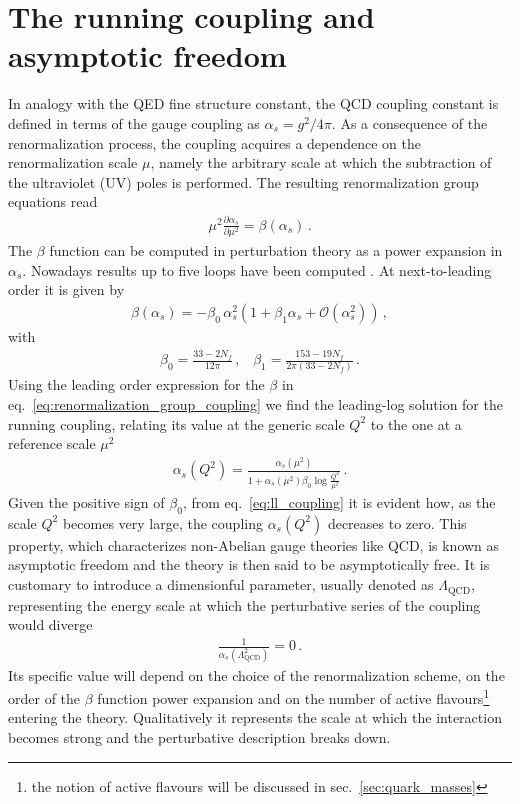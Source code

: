 \section{The running coupling and asymptotic freedom}
%
In analogy with the QED fine structure constant,
the QCD coupling constant is defined in terms of the gauge coupling as $\alpha_s = g^2/4\pi$.
As a consequence of the renormalization process, the coupling acquires a dependence on the renormalization scale $\mu$,
namely the arbitrary scale at which the subtraction of the ultraviolet (UV) poles is performed. 
The resulting renormalization group equations read
\begin{align}
    \label{eq:renormalization_group_coupling}
    \mu^2\frac{\partial\alpha_s}{\partial \mu^2} = \beta\left(\alpha_s\right)\,.
\end{align}
The $\beta$ function can be computed in perturbation theory as a power expansion in $\alpha_s$. 
Nowadays results up to five loops have been computed \cite{Herzog:2017ohr}.
At next-to-leading order it is given by
\begin{align}
    \label{eq:beta_function_expansion}
    \beta\left(\alpha_s\right) = -\beta_0\,\alpha_s^2\left(1+ \beta_1 \alpha_s + \mathcal{O}\left(\alpha_s^2\right)\right)\,,
\end{align}
with
\begin{align}
    \label{eq:beta_function_coefficients}
    \beta_0 = \frac{33 - 2 N_f}{12\pi}\,,\,\,\,\,\,
    \beta_1 = \frac{153 -19 N_f}{2\pi\left(33-2 N_f\right)}\,.
\end{align}
Using the leading order expression for the $\beta$ in eq.~\eqref{eq:renormalization_group_coupling} we find the leading-log
solution for the running coupling, relating its value at the generic scale $Q^2$ to the one at a reference scale
$\mu^2$ 
\begin{align}
    \label{eq:ll_coupling}
    \alpha_s\left(Q^2\right) = \frac{\alpha_s\left(\mu^2\right)}{1+\alpha_s\left(\mu^2\right)\beta_0\log\frac{Q^2}{\mu^2}}\,.
\end{align}
Given the positive sign of $\beta_0$, from eq.~\eqref{eq:ll_coupling} it is evident how, as the scale $Q^2$ becomes very large, 
the coupling $\alpha_s\left(Q^2\right)$ decreases to zero. This property, which characterizes non-Abelian gauge theories 
like QCD, is known as asymptotic freedom and the theory is then said to be asymptotically free.
It is customary to introduce a dimensionful parameter, usually denoted as $\Lambda_{\text{QCD}}$, representing the energy 
scale at which the perturbative series of the coupling would diverge
\begin{align}
    \label{eq:lambda_QCD}
    \frac{1}{\alpha_s\left(\Lambda_{\text{QCD}}^2\right)} = 0\,.
\end{align}
Its specific value will depend on the choice of the renormalization scheme, on the order
of the $\beta$ function power expansion and on the number of active flavours\footnote{the notion of active flavours will
be discussed in sec.~\ref{sec:quark_masses}} entering the theory.
Qualitatively it represents the scale at which the interaction becomes strong and the perturbative description breaks down.

